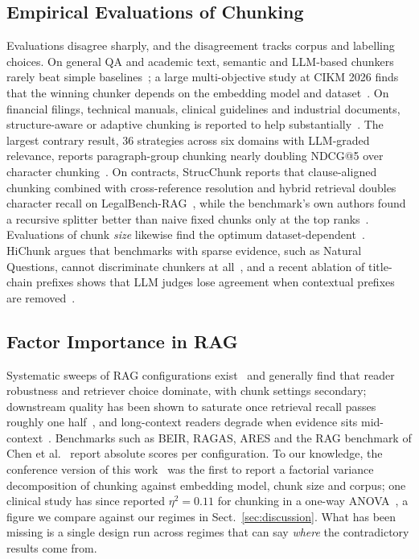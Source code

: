 \documentclass[runningheads]{llncs}
\begin{document}
\subsection{Empirical Evaluations of Chunking}
Evaluations disagree sharply, and the disagreement tracks corpus and labelling choices. On general QA and academic text, semantic and LLM-based chunkers rarely beat simple baselines~\cite{qu2025semantic,bennani2026systematic,kreileder2026academic,caspari2026complex,li2025enhancing}; a large multi-objective study at CIKM 2026 finds that the winning chunker depends on the embedding model and dataset~\cite{caspari2026complex}. On financial filings, technical manuals, clinical guidelines and industrial documents, structure-aware or adaptive chunking is reported to help substantially~\cite{jimenoyepes2024financial,taiwo2026oilgas,gomezcabello2025clinical,demoura2026adaptive}. The largest contrary result, 36 strategies across six domains with LLM-graded relevance, reports paragraph-group chunking nearly doubling NDCG@5 over character chunking~\cite{shaukat2026systematic}. On contracts, StrucChunk reports that clause-aligned chunking combined with cross-reference resolution and hybrid retrieval doubles character recall on LegalBench-RAG~\cite{singh2026strucchunk}, while the benchmark's own authors found a recursive splitter better than naive fixed chunks only at the top ranks~\cite{pipitone2024legalbenchrag}. Evaluations of chunk \emph{size} likewise find the optimum dataset-dependent~\cite{bhat2025chunksize,smith2024chroma}. HiChunk argues that benchmarks with sparse evidence, such as Natural Questions, cannot discriminate chunkers at all~\cite{lu2025hichunk}, and a recent ablation of title-chain prefixes shows that LLM judges lose agreement when contextual prefixes are removed~\cite{yang2026titlechain}.

\subsection{Factor Importance in RAG}
Systematic sweeps of RAG configurations exist~\cite{wang2024bestpractices,li2025enhancing,hsia2025ragged} and generally find that reader robustness and retriever choice dominate, with chunk settings secondary; downstream quality has been shown to saturate once retrieval recall passes roughly one half~\cite{leto2024optimal}, and long-context readers degrade when evidence sits mid-context~\cite{liu2024lost}. Benchmarks such as BEIR, RAGAS, ARES and the RAG benchmark of Chen et al.~\cite{thakur2021beir,es2024ragas,saadfalcon2024ares,chen2024benchmarking} report absolute scores per configuration. To our knowledge, the conference version of this work~\cite{chauhan2026chunking} was the first to report a factorial variance decomposition of chunking against embedding model, chunk size and corpus; one clinical study has since reported $\eta^2 = 0.11$ for chunking in a one-way ANOVA~\cite{gomezcabello2025clinical}, a figure we compare against our regimes in Sect.~\ref{sec:discussion}. What has been missing is a single design run across regimes that can say \emph{where} the contradictory results come from.
\end{document}
